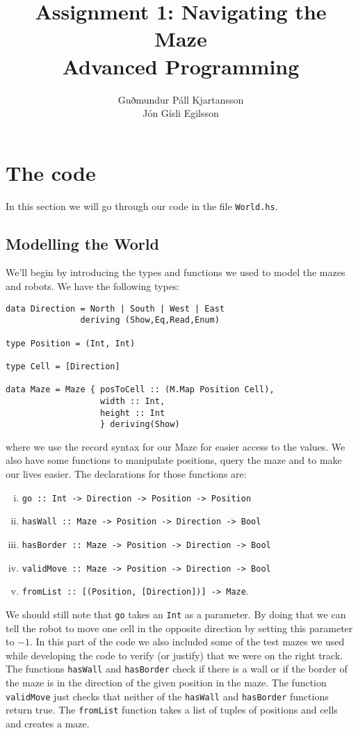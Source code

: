 \documentclass[a4paper,10pt]{article}
\title{
	Assignment 1: Navigating the Maze\\
	Advanced Programming
  }
\author{
	Guðmundur Páll Kjartansson\\
	Jón Gísli Egilsson	
}
\begin{document}
\maketitle

\section{The code}

In this section we will go through our code in the file \verb=World.hs=.

\subsection{Modelling the World}

We'll begin by introducing the types and functions we used to model the mazes and robots. We have the following types:
\begin{verbatim}
data Direction = North | South | West | East 
               deriving (Show,Eq,Read,Enum)

type Position = (Int, Int)

type Cell = [Direction]

data Maze = Maze { posToCell :: (M.Map Position Cell),
                   width :: Int,
                   height :: Int 
                   } deriving(Show)
\end{verbatim}
where we use the record syntax for our Maze for easier access to the values. We also have some functions to manipulate positions, query the maze and to make our lives easier. The declarations for those functions are:
\begin{enumerate}[i.]
	\item \verb=go :: Int -> Direction -> Position -> Position=
	\item \verb=hasWall :: Maze -> Position -> Direction -> Bool=
	\item \verb=hasBorder :: Maze -> Position -> Direction -> Bool=
	\item \verb=validMove :: Maze -> Position -> Direction -> Bool=
	\item \verb=fromList :: [(Position, [Direction])] -> Maze=.
\end{enumerate}
We should still note that \verb=go= takes an \verb=Int= as a parameter. By doing that we can tell the robot to move one cell in the opposite direction by setting this parameter to $-1$. In this part of the code we also included some of the test mazes we used while developing the code to verify (or justify) that we were on the right track. The functions \verb=hasWall= and \verb=hasBorder= check if there is a wall or if the border of the maze is in the direction of the given position in the maze. The function \verb=validMove= just checks that neither of the \verb=hasWall= and \verb=hasBorder= functions return true. The \verb=fromList= function takes a list of tuples of positions and cells and creates a maze.
\end{document}
